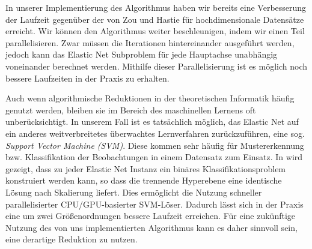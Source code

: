 In unserer Implementierung des Algorithmus haben wir bereits eine Verbesserung der Laufzeit gegenüber der von Zou und Hastie für hochdimensionale Datensätze erreicht. Wir können den Algorithmus weiter beschleunigen, indem wir einen Teil parallelisieren. Zwar müssen die Iterationen hintereinander ausgeführt werden, jedoch kann das Elastic Net Subproblem für jede Hauptachse unabhängig voneinander berechnet werden. Mithilfe dieser Parallelisierung ist es möglich noch bessere Laufzeiten in der Praxis zu erhalten.

Auch wenn algorithmische Reduktionen in der theoretischen Informatik häufig genutzt werden, bleiben sie im Bereich des maschinellen Lernens oft unberücksichtigt. In unserem Fall ist es tatsächlich möglich, das Elastic Net auf ein anderes weitverbreitetes überwachtes Lernverfahren zurückzuführen, eine sog. \textit{Support Vector Machine (SVM)}. Diese kommen sehr häufig für Mustererkennung bzw. Klassifikation der Beobachtungen in einem Datensatz zum Einsatz. In \cite{zhou} wird gezeigt, dass zu jeder Elastic Net Instanz ein binäres Klassifikationsproblem konstruiert werden kann, so dass die trennende Hyperebene eine identische Lösung nach Skalierung liefert. Dies ermöglicht die Nutzung schneller parallelisierter CPU/GPU-basierter SVM-Löser. Dadurch lässt sich in der Praxis eine um zwei Größenordnungen bessere Laufzeit erreichen. Für eine zukünftige Nutzung des von uns implementierten Algorithmus kann es daher sinnvoll sein, eine derartige Reduktion zu nutzen.
